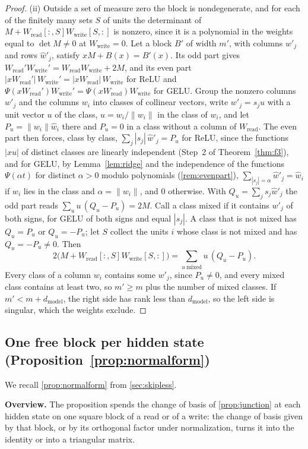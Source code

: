 \documentclass[10pt]{article}
\theoremstyle{definition}
\theoremstyle{remark}
\newcommand{\Wread}{W_{\mathrm{read}}}
\newcommand{\Wwrite}{W_{\mathrm{write}}}
\newcommand{\dm}{d_{\mathrm{model}}}
\newcommand{\norm}[1]{\lVert #1\rVert}
\newcommand{\para}[1]{\smallskip\noindent\textbf{#1}\hspace{0.5em}}
\begin{document}
\begin{proof}
(ii) Outside a set of measure zero the block is nondegenerate, and for each of the finitely many sets $S$ of units the determinant of $M + \Wread[{:},S]\Wwrite[S,{:}]$ is nonzero, since it is a polynomial in the weights equal to $\det M \neq 0$ at $\Wwrite = 0$. Let a block $B'$ of width $m'$, with columns $w'_j$ and rows $\hat w'_j$, satisfy $xM + B(x) = B'(x)$. Its odd part gives $\Wread'\Wwrite' = \Wread\Wwrite + 2M$, and its even part $|x\Wread'|\,\Wwrite' = |x\Wread|\,\Wwrite$ for ReLU and $\Psi(x\Wread')\Wwrite' = \Psi(x\Wread)\Wwrite$ for GELU. Group the nonzero columns $w'_j$ and the columns $w_i$ into classes of collinear vectors, write $w'_j = s_ju$ with a unit vector $u$ of the class, $u = w_i/\norm{w_i}$ in the class of $w_i$, and let $P_u = \norm{w_i}\hat w_i$ there and $P_u = 0$ in a class without a column of $\Wread$. The even part then forces, class by class, $\sum_j |s_j|\,\hat w'_j = P_u$ for ReLU, since the functions $|xu|$ of distinct classes are linearly independent (Step~2 of Theorem~\ref{thm:f3}), and for GELU, by Lemma~\ref{lem:ridge} and the independence of the functions $\Psi(\alpha t)$ for distinct $\alpha > 0$ modulo polynomials (\cref{rem:evenpart}), $\sum_{|s_j| = \alpha}\hat w'_j = \hat w_i$ if $w_i$ lies in the class and $\alpha = \norm{w_i}$, and $0$ otherwise. With $Q_u = \sum_j s_j\hat w'_j$ the odd part reads $\sum_u u\,(Q_u - P_u) = 2M$. Call a class mixed if it contains $w'_j$ of both signs, for GELU of both signs and equal $|s_j|$. A class that is not mixed has $Q_u = P_u$ or $Q_u = -P_u$; let $S$ collect the units $i$ whose class is not mixed and has $Q_u = -P_u \neq 0$. Then
\[
2\big(M + \Wread[{:},S]\Wwrite[S,{:}]\big) = \sum_{u\ \mathrm{mixed}} u\,(Q_u - P_u) .
\]
Every class of a column $w_i$ contains some $w'_j$, since $P_u \neq 0$, and every mixed class contains at least two, so $m' \ge m$ plus the number of mixed classes. If $m' < m + \dm$, the right side has rank less than $\dm$, so the left side is singular, which the weights exclude.
\end{proof}

\subsection{One free block per hidden state\texorpdfstring{ (Proposition~\ref*{prop:normalform})}{}}\label{app:prf-normalform}

We recall \cref{prop:normalform} from \cref{sec:skipless}.
\propNormalForm*

\para{Overview.} The proposition spends the change of basis of \cref{prop:junction} at each hidden state on one square block of a read or of a write: the change of basis given by that block, or by its orthogonal factor under normalization, turns it into the identity or into a triangular matrix.
\end{document}
